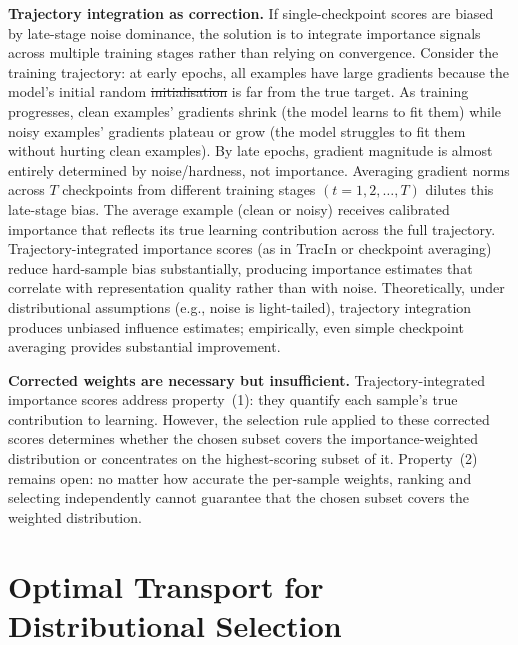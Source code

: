 \documentclass[12pt, a4paper, twoside]{book}
\makeatletter
\numberwithin{equation}{chapter}
\theoremstyle{plain}
\theoremstyle{definition}
\theoremstyle{remark}
\newenvironment{foldable}{}{}
\newcommand*{\eg}{e.g.}
\providecommand{\DIFaddtex}[1]{{\protect\color{blue}\uwave{#1}}} %
\providecommand{\DIFdeltex}[1]{{\protect\color{red}\sout{#1}}} %
\providecommand{\DIFaddbegin}{} %
\providecommand{\DIFaddend}{} %
\providecommand{\DIFdelbegin}{} %
\providecommand{\DIFdelend}{} %
\providecommand{\DIFadd}[1]{\texorpdfstring{\DIFaddtex{#1}}{#1}} %
\providecommand{\DIFdel}[1]{\texorpdfstring{\DIFdeltex{#1}}{}} %
\newcommand{\DIFscaledelfig}{0.5}
\newlength{\DIFdelgraphicswidth} %
\newlength{\DIFdelgraphicsheight} %
\newcommand{\DIFaddincludegraphics}[2][]{{\color{blue}\fbox{\DIFOincludegraphics[#1]{#2}}}} %
\newcommand{\DIFdelincludegraphics}[2][]{%
\sbox{\DIFdelgraphicsbox}{\DIFOincludegraphics[#1]{#2}}%
\settoboxwidth{\DIFdelgraphicswidth}{\DIFdelgraphicsbox} %
\settoboxtotalheight{\DIFdelgraphicsheight}{\DIFdelgraphicsbox} %
\scalebox{\DIFscaledelfig}{%
\parbox[b]{\DIFdelgraphicswidth}{\usebox{\DIFdelgraphicsbox}\\[-\baselineskip] \rule{\DIFdelgraphicswidth}{0em}}\llap{\resizebox{\DIFdelgraphicswidth}{\DIFdelgraphicsheight}{%
\setlength{\unitlength}{\DIFdelgraphicswidth}%
\begin{picture}(1,1)%
\thicklines\linethickness{2pt} %
{\color[rgb]{1,0,0}\put(0,0){\framebox(1,1){}}}%
{\color[rgb]{1,0,0}\put(0,0){\line( 1,1){1}}}%
{\color[rgb]{1,0,0}\put(0,1){\line(1,-1){1}}}%
\end{picture}%
}\hspace*{3pt}}} %
} %
\DeclareRobustCommand{\DIFaddbegin}{\DIFOaddbegin \let\includegraphics\DIFaddincludegraphics} %
\DeclareRobustCommand{\DIFaddend}{\DIFOaddend \let\includegraphics\DIFOincludegraphics} %
\DeclareRobustCommand{\DIFdelbegin}{\DIFOdelbegin \let\includegraphics\DIFdelincludegraphics} %
\DeclareRobustCommand{\DIFdelend}{\DIFOaddend \let\includegraphics\DIFOincludegraphics} %
\let\sout@orig\sout %
\renewcommand{\sout}[1]{\ifmmode\text{\sout@orig{\ensuremath{#1}}}\else\sout@orig{#1}\fi} %
\makeatother
\begin{document}
\begin{foldable}
  \textbf{Trajectory integration as correction.}
  If single-checkpoint scores are biased by late-stage noise dominance, the solution is to integrate importance signals across multiple training stages rather than relying on convergence.
  Consider the training trajectory: at early epochs, all examples have large gradients because the model's initial random \DIFdelbegin \DIFdel{initialisation }\DIFdelend \DIFaddbegin \DIFadd{initialization }\DIFaddend is far from the true target.
  As training progresses, clean examples' gradients shrink (the model learns to fit them) while noisy examples' gradients plateau or grow (the model struggles to fit them without hurting clean examples).
  By late epochs, gradient magnitude is almost entirely determined by noise/hardness, not importance.
  Averaging gradient norms across $T$ checkpoints from different training stages $(t=1, 2, \ldots, T)$ dilutes this late-stage bias.
  The average example (clean or noisy) receives calibrated importance that reflects its true learning contribution across the full trajectory.
  Trajectory-integrated importance scores (as in TracIn or checkpoint averaging) reduce hard-sample bias substantially, producing importance estimates that correlate with representation quality rather than with noise.
  Theoretically, under distributional assumptions (\eg, noise is light-tailed), trajectory integration produces unbiased influence estimates; empirically, even simple checkpoint averaging provides substantial improvement.
\end{foldable}

\begin{foldable}
  \textbf{Corrected weights are necessary but insufficient.}
  Trajectory-integrated importance scores address property~(1): they quantify each sample's true contribution to learning.
  However, the selection rule applied to these corrected scores determines whether the chosen subset covers the importance-weighted distribution or concentrates on the highest-scoring subset of it.
  Property~(2) remains open: no matter how accurate the per-sample weights, ranking and selecting independently cannot guarantee that the chosen subset covers the weighted distribution.
\end{foldable}
 \section{Optimal Transport for Distributional Selection} \label{sec:28-background-ot}
\end{document}
